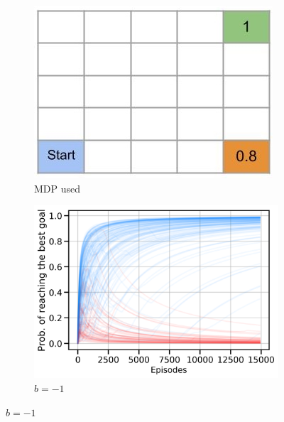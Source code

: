 \begin{figure}[ht]
\centering 
  \begin{subfigure}[b]{0.2\linewidth}
    \includegraphics[trim={0cm -0.75cm -0.1cm
      0},clip,width=\textwidth]{articles/baselines/figs/paper/Gridworld.jpg}
    \caption{MDP used}
    \label{fig:gridworld}
  \end{subfigure}
  \begin{subfigure}[b]{0.26\linewidth}
    \includegraphics[trim={0cm 0cm 0cm
      0},clip,width=\textwidth]{articles/baselines/figs/paper/mdp_baseline=-1.png}
    \caption{$b=-1$}
    \label{fig:mdp-1}

\end{subfigure}
\end{figure}
